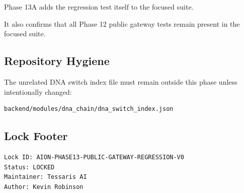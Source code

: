Phase 13A adds the regression test itself to the focused suite.

It also confirms that all Phase 12 public gateway tests remain present in the focused suite.

\subsection{Repository Hygiene}

The unrelated DNA switch index file must remain outside this phase unless intentionally changed:

\begin{verbatim}
backend/modules/dna_chain/dna_switch_index.json
\end{verbatim}

\subsection{Lock Footer}

\begin{verbatim}
Lock ID: AION-PHASE13-PUBLIC-GATEWAY-REGRESSION-V0
Status: LOCKED
Maintainer: Tessaris AI
Author: Kevin Robinson
\end{verbatim}
